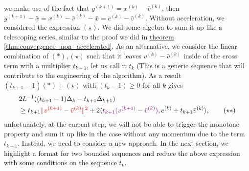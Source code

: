 \documentclass[]{article}
\theoremstyle{definition}
\begin{document}
        we make use of the fact that $y^{(k + 1)} = x^{(k)} - \bar v^{(k)}$, then $y^{(k + 1)} - \bar x = x^{(k)} - \bar v^{(k)} - \bar x = e^{(k)} - \bar v^{(k)}$. Without acceleration, we considered the expression $(\star)$. We did some algebra to sum it up like a telescoping series, similar to the proof we did in \hyperref[thm:convergence_non_accelerated]{theorem \ref*{thm:convergence_non_accelerated}}. As an alternative, we consider the linear combination of $(*), (\star)$ such that it leaves $v^{(k)} - \bar v^{(k)}$ inside of the cross term with a multiplier $t_{k + 1}$, let us call it $t_k$ (This is a generic sequence that will contribute to the engineering of the algorithm). As a result $(t_{k + 1}- 1)(*) + (\star)$ with $(t_k - 1)\ge 0$ for all $k$ gives
        \begin{align*}
            & 2L^{-1}((t_{k + 1} - 1)\Delta_k - t_{k + 1}\Delta_{k + 1})
            \\
            & \ge 
            t_{k + 1}
            \textcolor{red}{\Vert v^{(k + 1)} - \bar v^{(k)}\Vert^2} + 
            2\langle 
                \textcolor{violet}{t_{k + 1}(v^{(k + 1)} - \bar v^{(k)})}, e^{(k)} + t_{k + 1} \bar v^{(k)}
            \rangle, 
            \tag{$\star*$}
        \end{align*}
        unfortunately, at the current step, we will not be able to trigger the monotone property and sum it up like in the case without any momentum due to the term $t_{k + 1}$. Instead, we need to consider a new approach. In the next section, we highlight a format for two bounded sequences and reduce the above expression with some conditions on the sequence $t_k$. 
\end{document}
